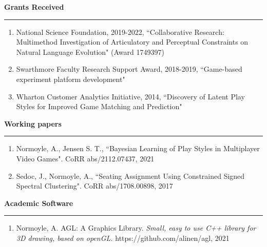 \medskip
\medskip

{\Large {\bf Grants Received}}
\vspace{0.1cm}
\hrule
\medskip

\begin{enumerate}[leftmargin=*]
\item National Science Foundation, 2019-2022, 
``Collaborative Research: Multimethod Investigation of Articulatory and Perceptual Constraints on Natural Language Evolution" (Award 1749397)

\item Swarthmore Faculty Research Support Award, 2018-2019, ``Game-based experiment platform development"

\item Wharton Customer Analytics Initiative, 2014, ``Discovery of Latent Play Styles for Improved Game Matching and Prediction"
\end{enumerate}

\medskip
\medskip

{\Large {\bf  Working papers}}
\vspace{0.1cm}
\hrule
\medskip

\begin{enumerate}[leftmargin=*]
\item Normoyle, A., Jensen S. T., ``Bayesian Learning of Play Styles in Multiplayer Video Games". CoRR abs/2112.07437, 2021 

\item Sedoc, J., Normoyle, A., ``Seating Assignment Using Constrained Signed Spectral Clustering". CoRR abs/1708.00898, 2017 
\end{enumerate}

\medskip
\medskip

{\Large {\bf Academic Software}}
\vspace{0.1cm}
\hrule
\medskip

\begin{enumerate}[leftmargin=*]
\item Normoyle, A. AGL: A Graphics Library. \textit{Small, easy to use C++ library for 3D drawing, based on openGL.} https://github.com/alinen/agl, 2021
\end{enumerate}
